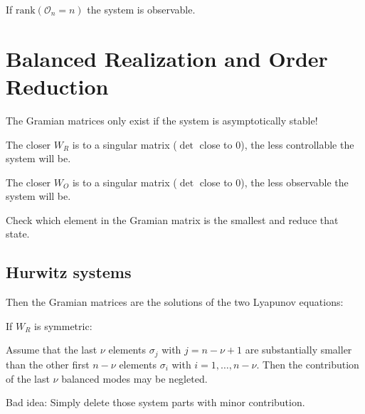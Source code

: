 \documentclass[10pt,a4paper]{scrartcl}
\begin{document}
\begin{multicols*}{3}
If $\text{rank}(\mathcal{O}_n=n)$ the system is observable.

\vfill

\section{Balanced Realization and Order Reduction}

The Gramian matrices only exist if the system is asymptotically stable!


The closer $W_R$ is to a singular matrix ($\det$ close to 0), the less controllable the system will be.


The closer $W_O$ is to a singular matrix ($\det$ close to 0), the less observable the system will be.

\dahe Check which element in the Gramian matrix is the smallest and reduce that state.

\columnbreak

\subsection{Hurwitz systems}


Then the Gramian matrices are the solutions of the two Lyapunov equations:


If $W_R$ is symmetric:



Assume that the last $\nu$ elements $\sigma_j$ with $j=n-\nu+1$ are substantially smaller than the other first $n-\nu$ elements $\sigma_i$ with $i=1,\ldots, n-\nu$. Then the contribution of the last $\nu$ balanced modes may be negleted.

\finn

Bad idea: Simply delete those system parts with minor contribution.


\end{multicols*}
\end{document}
